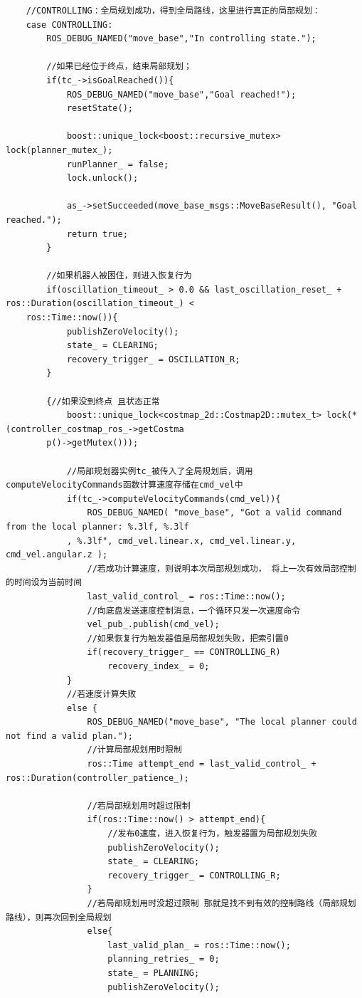 \documentclass[9pt, oneside]{book}
\begin{document}
\footnotesize
\begin{verbatim}
    //CONTROLLING：全局规划成功，得到全局路线，这里进行真正的局部规划：
    case CONTROLLING:
        ROS_DEBUG_NAMED("move_base","In controlling state.");

        //如果已经位于终点，结束局部规划；
        if(tc_->isGoalReached()){
            ROS_DEBUG_NAMED("move_base","Goal reached!");
            resetState();

            boost::unique_lock<boost::recursive_mutex> lock(planner_mutex_);
            runPlanner_ = false;
            lock.unlock();

            as_->setSucceeded(move_base_msgs::MoveBaseResult(), "Goal reached.");
            return true;
        }

        //如果机器人被困住，则进入恢复行为
        if(oscillation_timeout_ > 0.0 && last_oscillation_reset_ + ros::Duration(oscillation_timeout_) <
    ros::Time::now()){
            publishZeroVelocity();
            state_ = CLEARING;
            recovery_trigger_ = OSCILLATION_R;
        }

        {//如果没到终点 且状态正常
            boost::unique_lock<costmap_2d::Costmap2D::mutex_t> lock(*(controller_costmap_ros_->getCostma
        p()->getMutex()));

            //局部规划器实例tc_被传入了全局规划后，调用computeVelocityCommands函数计算速度存储在cmd_vel中
            if(tc_->computeVelocityCommands(cmd_vel)){
                ROS_DEBUG_NAMED( "move_base", "Got a valid command from the local planner: %.3lf, %.3lf
            , %.3lf", cmd_vel.linear.x, cmd_vel.linear.y, cmd_vel.angular.z );
                //若成功计算速度，则说明本次局部规划成功， 将上一次有效局部控制的时间设为当前时间
                last_valid_control_ = ros::Time::now();
                //向底盘发送速度控制消息，一个循环只发一次速度命令
                vel_pub_.publish(cmd_vel);
                //如果恢复行为触发器值是局部规划失败，把索引置0
                if(recovery_trigger_ == CONTROLLING_R)
                    recovery_index_ = 0;
            }
            //若速度计算失败
            else {
                ROS_DEBUG_NAMED("move_base", "The local planner could not find a valid plan.");
                //计算局部规划用时限制
                ros::Time attempt_end = last_valid_control_ + ros::Duration(controller_patience_);

                //若局部规划用时超过限制
                if(ros::Time::now() > attempt_end){
                    //发布0速度，进入恢复行为，触发器置为局部规划失败
                    publishZeroVelocity();
                    state_ = CLEARING;
                    recovery_trigger_ = CONTROLLING_R;
                }
                //若局部规划用时没超过限制 那就是找不到有效的控制路线（局部规划路线），则再次回到全局规划
                else{
                    last_valid_plan_ = ros::Time::now();
                    planning_retries_ = 0;
                    state_ = PLANNING;
                    publishZeroVelocity();


\end{verbatim}
\end{document}
